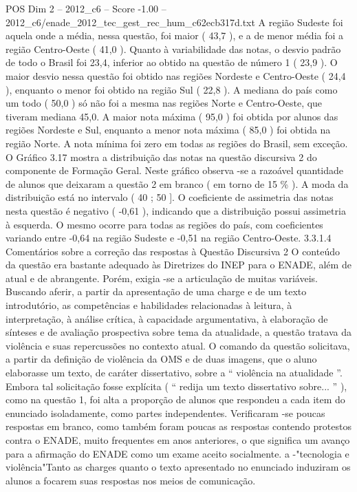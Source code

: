 \begin{textsample}{POS Dim 2 – 2012\_c6 – Score -1.00 – 2012\_c6/enade\_2012\_tec\_gest\_rec\_hum\_c62ecb317d.txt}
A região Sudeste foi aquela onde a média, nessa questão, foi maior ( 43,7 ), e a de menor média foi a região Centro-Oeste ( 41,0 ).
Quanto à variabilidade das notas, o desvio padrão de todo o Brasil foi 23,4, inferior ao obtido na questão de número 1 ( 23,9 ).
O maior desvio nessa questão foi obtido nas regiões Nordeste e Centro-Oeste ( 24,4 ), enquanto o menor foi obtido na região Sul ( 22,8 ).
A mediana do país como um todo ( 50,0 ) só não foi a mesma nas regiões Norte e Centro-Oeste, que tiveram mediana 45,0.
A maior nota máxima ( 95,0 ) foi obtida por alunos das regiões Nordeste e Sul, enquanto a menor nota máxima ( 85,0 ) foi obtida na região Norte.
A nota mínima foi zero em todas as regiões do Brasil, sem exceção.
O Gráfico 3.17 mostra a distribuição das notas na questão discursiva 2 do componente de Formação Geral.
Neste gráfico observa -se a razoável quantidade de alunos que deixaram a questão 2 em branco ( em torno de 15 \% ).
A moda da distribuição está no intervalo ( 40 ; 50 ].
O coeficiente de assimetria das notas nesta questão é negativo ( -0,61 ), indicando que a distribuição possui assimetria à esquerda.
O mesmo ocorre para todas as regiões do país, com coeficientes variando entre -0,64 na região Sudeste e -0,51 na região Centro-Oeste. 3.3.1.4 Comentários sobre a correção das respostas à Questão Discursiva 2 O conteúdo da questão era bastante adequado às Diretrizes do INEP para o ENADE, além de atual e de abrangente.
Porém, exigia -se a articulação de muitas variáveis.
Buscando aferir, a partir da apresentação de uma charge e de um texto introdutório, as competências e habilidades relacionadas à leitura, à interpretação, à análise crítica, à capacidade argumentativa, à elaboração de sínteses e de avaliação prospectiva sobre tema da atualidade, a questão tratava da violência e suas repercussões no contexto atual.
O comando da questão solicitava, a partir da definição de violência da OMS e de duas imagens, que o aluno elaborasse um texto, de caráter dissertativo, sobre a “ violência na atualidade ”.
Embora tal solicitação fosse explícita ( “ redija um texto dissertativo sobre... ” ), como na questão 1, foi alta a proporção de alunos que respondeu a cada item do enunciado isoladamente, como partes independentes.
Verificaram -se poucas respostas em branco, como também foram poucas as respostas contendo protestos contra o ENADE, muito frequentes em anos anteriores, o que significa um avanço para a afirmação do ENADE como um exame aceito socialmente. a -"tecnologia e violência"Tanto as charges quanto o texto apresentado no enunciado induziram os alunos a focarem suas respostas nos meios de comunicação.

\end{textsample}
